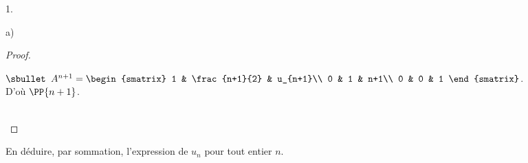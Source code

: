 \documentclass[11pt]{article}%
\begin{document}
\begin{noliste}{1.}
\begin{noliste}{a)}
\begin{proof}
\begin{noliste}{\fitem}
\begin{noliste}{$\sbullet$}
          $A^{n+1} =
          \begin{smatrix}
            1 & \frac{n+1}{2} & u_{n+1}\\
            0 & 1 & n+1\\
            0 & 0 & 1
          \end{smatrix}$.\\
          D'où $\PP{n+1}$.
        \end{noliste}        
      \end{noliste}
      ~\\[-1cm]
    \end{proof}


    \newpage


  \item En déduire, par sommation, l'expression de $u_{n}$ pour tout
    entier $n$.


\end{noliste}
\end{noliste}
\end{document}
